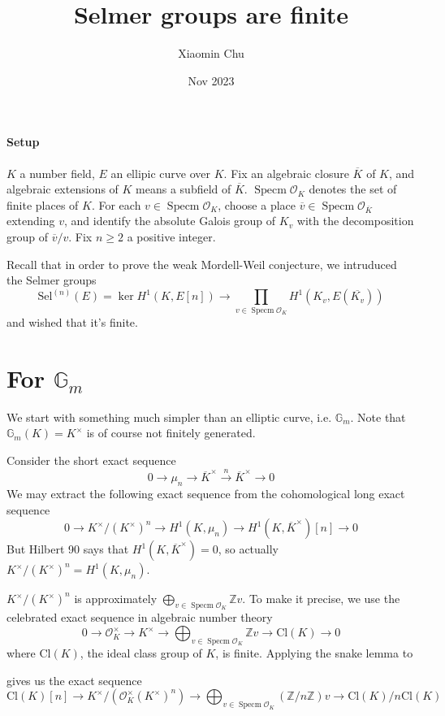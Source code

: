\documentclass{article}
\title{Selmer groups are finite}
\author{Xiaomin Chu}
\date{Nov 2023}
\newcommand{\ord}{\mathcal{O}}
\newcommand{\mn}{\mu_{n}}
\newcommand{\kmkn}{K ^{\times} / (K ^{\times})^{n}}
\DeclareMathOperator{\spec}{Specm}
\begin{document}
\maketitle

\paragraph{Setup}
$ K $ a number field, $ E $ an ellipic curve over $ K $.
Fix an algebraic closure $ \overline{K} $ of $ K $,
and algebraic extensions of $ K $ means a subfield of $ \overline{K} $.
$ \spec \ord _{K} $ denotes the set of finite places of $ K $.
For each $ v\in \spec \ord _{K} $, choose a place
$ \overline{v}\in \spec \ord _{\overline{K}} $ extending $ v $,
and identify the absolute Galois group of $ K _{v} $ with
the decomposition group of $ \overline{v}/v $.
Fix $ n \geq 2 $ a positive integer.

Recall that in order to prove the weak Mordell-Weil conjecture,
we intruduced the Selmer groups
$$ \mathrm{Sel}^{(n)}(E) = \ker H ^{1}(K, E [n])\to
\prod _{v\in \spec \ord _{K}} H ^{1}(K _{v}, E (\overline{K _{v}})) $$
and wished that it's finite.

\section{For $ \mathbb{G}_{m} $}

We start with something much simpler than an elliptic curve, i.e. $ \mathbb{G}_{m} $.
Note that $ \mathbb{G}_{m}(K) = K ^{\times} $ is of course not finitely generated.

Consider the short exact sequence
$$ 0 \to \mn \to \overline{K}^{\times} \xrightarrow{n} \overline{K}^{\times}\to 0 $$
We may extract the following exact sequence from the cohomological long exact sequence
$$ 0\to \kmkn \to H ^{1}(K, \mn)\to H ^{1}(K, \overline{K}^{\times})[n]\to 0  $$
But Hilbert 90 says that $ H ^{1}(K, \overline{K}^{\times}) = 0 $,
so actually $ \kmkn = H ^{1}(K, \mn) $.

$ \kmkn $ is approximately $ \bigoplus _{v\in\spec \ord _{K}} \mathbb{Z}v $.
To make it precise, we use the celebrated exact sequence in algebraic number theory
$$ 0\to \ord _{K}^{\times} \to K ^{\times}\to \bigoplus _{v\in \spec \ord _{K}} \mathbb{Z}v 
\to \mathrm{Cl}(K)\to 0$$
where $ \mathrm{Cl}(K) $, the ideal class group of $ K $, is finite.
Applying the snake lemma to
\begin{figure}[H]
\centering
{}
\end{figure}
gives us the exact sequence
$$ \mathrm{Cl}(K)[n] \to K ^{\times}/(\ord _{K}^{\times} (K ^{\times})^{n})\to
\bigoplus _{v\in \spec \ord _{K}} (\mathbb{Z}/n \mathbb{Z}) v \to
\mathrm{Cl}(K)/n \mathrm{Cl}(K)$$
\end{document}
